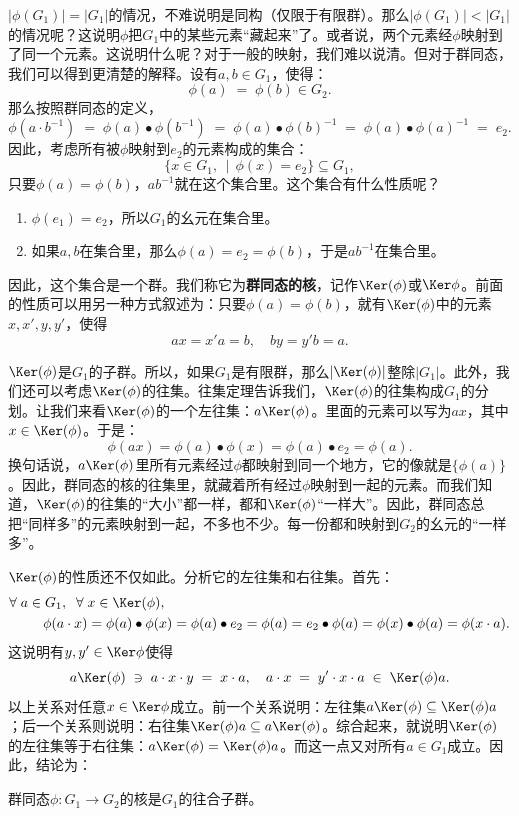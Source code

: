 \documentclass[12pt,UTF8,fontset=none]{ctexbook}
\begin{document}
$\left|\phi(G_1)\right| = |G_1|$的情况，不难说明是同构（仅限于有限群）。那么$\left|\phi(G_1)\right| < |G_1|$的情况呢？这说明$\phi$把$G_1$中的某些元素“藏起来”了。或者说，两个元素经$\phi$映射到了同一个元素。这说明什么呢？对于一般的映射，我们难以说清。但对于群同态，我们可以得到更清楚的解释。设有$a,b\in G_1$，使得：
\[\phi(a) \;= \; \phi(b) \in G_2.\]
那么按照群同态的定义，
\[\phi(a\cdot b^{-1}) \;=\; \phi(a)\bullet\phi(b^{-1}) \;=\; \phi(a)\bullet\phi(b)^{-1} \; =\; \phi(a)\bullet\phi(a)^{-1} \; =\; e_2.  \]
因此，考虑所有被$\phi$映射到$e_2$的元素构成的集合：
\[ \{x\in G_1,\,\mid\,\phi(x)=e_2\}\subseteq G_1,\]
只要$\phi(a) = \phi(b)$，$ab^{-1}$就在这个集合里。这个集合有什么性质呢？
\begin{enumerate}
    \item $\phi(e_1) = e_2$，所以$G_1$的幺元在集合里。
    \item 如果$a,b$在集合里，那么$\phi(a) = e_2 = \phi(b)$，于是$ab^{-1}$在集合里。
\end{enumerate}
因此，这个集合是一个群。我们称它为\textbf{群同态的核}，记作$\Ker(\phi)$或$\Ker\phi$。前面的性质可以用另一种方式叙述为：只要$\phi(a) = \phi(b)$，就有$\Ker(\phi)$中的元素$x,x',y,y'$，使得
$$ ax = x'a = b, \quad by = y'b = a.$$

$\Ker(\phi)$是$G_1$的子群。所以，如果$G_1$是有限群，那么$\left|\Ker(\phi)\right|$整除$|G_1|$。此外，我们还可以考虑$\Ker(\phi)$的往集。往集定理告诉我们，$\Ker(\phi)$的往集构成$G_1$的分划。让我们来看$\Ker(\phi)$的一个左往集：$a\Ker(\phi)$。里面的元素可以写为$ax$，其中$x\in\Ker(\phi)$。于是：
\[ \phi(ax) = \phi(a)\bullet\phi(x) = \phi(a)\bullet e_2 = \phi(a).\]
换句话说，$a\Ker(\phi)$里所有元素经过$\phi$都映射到同一个地方，它的像就是$\{\phi(a)\}$。因此，群同态的核的往集里，就藏着所有经过$\phi$映射到一起的元素。而我们知道，$\Ker(\phi)$的往集的“大小”都一样，都和$\Ker(\phi)$“一样大”。因此，群同态总把“同样多”的元素映射到一起，不多也不少。每一份都和映射到$G_2$的幺元的“一样多”。

$\Ker(\phi)$的性质还不仅如此。分析它的左往集和右往集。首先：
\begin{align*}
    \forall \;a\in G_1, \;\;\forall\; &x\in\Ker(\phi),\\
    \phi(a\cdot x) &= \phi(a)\bullet\phi(x) = \phi(a)\bullet e_2 = \phi(a) = e_2\bullet \phi(a) = \phi(x)\bullet\phi(a) = \phi(x\cdot a).
\end{align*}
这说明有$y, y'\in\Ker\phi$使得
\[a\Ker(\phi) \;\ni \;a\cdot x \cdot y \;=\; x\cdot a, \quad a\cdot x \;=\; y'\cdot x\cdot a\;\in\;\Ker(\phi) a.\]
以上关系对任意$x\in\Ker\phi$成立。前一个关系说明：左往集$a\Ker(\phi)\subseteq\Ker(\phi) a$；后一个关系则说明：右往集$\Ker(\phi) a\subseteq a \Ker(\phi)$。综合起来，就说明$\Ker(\phi)$的左往集等于右往集：$a\Ker(\phi) = \Ker(\phi) a$。而这一点又对所有$a\in G_1$成立。因此，结论为：
\begin{pp}
    群同态$\phi:G_1\rightarrow G_2$的核是$G_1$的往合子群。
\end{pp}
\end{document}

